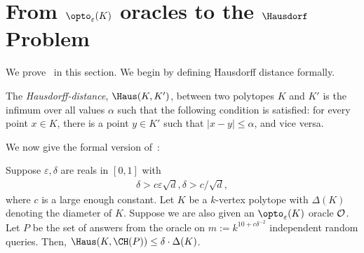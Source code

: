 \section{From $\opto_\varepsilon(K)$ oracles to the $\Hausdorf$ Problem}
\label{sec:haus}
We prove~ in this section. We begin by defining Hausdorff distance formally. 



\begin{defn}
\label{defn:Haus}
    The {\em Hausdorff-distance}, $\Haus(K,K')$, between two polytopes $K$ and $K'$ is the infimum over all values $\alpha$ such that the following condition is satisfied: for every point $x \in K$, there is a point $y \in K'$ such that $|x-y| \leq \alpha$, and vice versa.
\end{defn}

%
We now give the formal version of~:
\begin{theorem}\label{upper-bound-3}
Suppose $\varepsilon,\delta$ are reals in $[0,1]$ with 
\begin{align}
\label{eq:deltacond}
    \delta > c \varepsilon \sqrt{d}, \delta > c/\sqrt{d}, 
\end{align}
where $c$ is a large enough constant. 
  Let $K$ be a $k$-vertex polytope with $\Delta(K)$ denoting the diameter of $K$. Suppose we are also given an  $ \opto_\varepsilon(K)$ oracle $\cal O$.  
    Let 
  $P$ be the set of answers from the oracle on $m:= k^{10+c \delta^{-2}}$ independent random queries. Then, $\Haus(K, \CH(P)) \leq \delta \cdot \Delta(K)$. 
\end{theorem}


